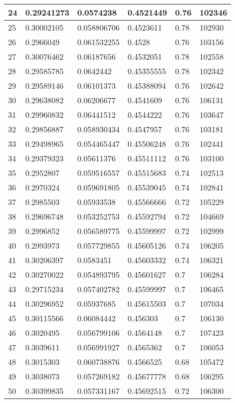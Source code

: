 \begin{longtable}{|l|l|l|l|l|l|}
24 & 0.29241273 & 0.0574238 & 0.4521449 & 0.76 & 102346 \\ \hline 
25 & 0.30002105 & 0.058806706 & 0.4523611 & 0.78 & 102930 \\ \hline 
26 & 0.2966049 & 0.061532255 & 0.4528 & 0.76 & 103156 \\ \hline 
27 & 0.30076462 & 0.06187656 & 0.4532051 & 0.78 & 102558 \\ \hline 
28 & 0.29585785 & 0.0642442 & 0.45355555 & 0.78 & 102342 \\ \hline 
29 & 0.29589146 & 0.06101373 & 0.45388094 & 0.76 & 102642 \\ \hline 
30 & 0.29638082 & 0.06206677 & 0.4541609 & 0.76 & 106131 \\ \hline 
31 & 0.29960832 & 0.06441512 & 0.4544222 & 0.76 & 103647 \\ \hline 
32 & 0.29856887 & 0.058930434 & 0.4547957 & 0.76 & 103181 \\ \hline 
33 & 0.29498965 & 0.054465447 & 0.45506248 & 0.76 & 102441 \\ \hline 
34 & 0.29379323 & 0.05611376 & 0.45511112 & 0.76 & 103100 \\ \hline 
35 & 0.2952807 & 0.059516557 & 0.45515683 & 0.74 & 102513 \\ \hline 
36 & 0.2970324 & 0.059691805 & 0.45539045 & 0.74 & 102841 \\ \hline 
37 & 0.2985503 & 0.05933538 & 0.45566666 & 0.72 & 105229 \\ \hline 
38 & 0.29696748 & 0.053252753 & 0.45592794 & 0.72 & 104669 \\ \hline 
39 & 0.2996852 & 0.056589775 & 0.45599997 & 0.72 & 102999 \\ \hline 
40 & 0.2993973 & 0.057729855 & 0.45605126 & 0.74 & 106205 \\ \hline 
41 & 0.30206397 & 0.0583451 & 0.45603332 & 0.74 & 106321 \\ \hline 
42 & 0.30270022 & 0.054893795 & 0.45601627 & 0.7 & 106284 \\ \hline 
43 & 0.29715234 & 0.057402782 & 0.45599997 & 0.7 & 106465 \\ \hline 
44 & 0.30296952 & 0.05937685 & 0.45615503 & 0.7 & 107034 \\ \hline 
45 & 0.30115566 & 0.06084442 & 0.456303 & 0.7 & 106130 \\ \hline 
46 & 0.3020495 & 0.056799106 & 0.4564148 & 0.7 & 107423 \\ \hline 
47 & 0.3039611 & 0.056991927 & 0.4565362 & 0.7 & 106053 \\ \hline 
48 & 0.3015303 & 0.060738876 & 0.4566525 & 0.68 & 105472 \\ \hline 
49 & 0.3038073 & 0.057269182 & 0.45677778 & 0.68 & 106295 \\ \hline 
50 & 0.30399835 & 0.057331167 & 0.45692515 & 0.72 & 106300 \\ \hline 
\end{longtable}